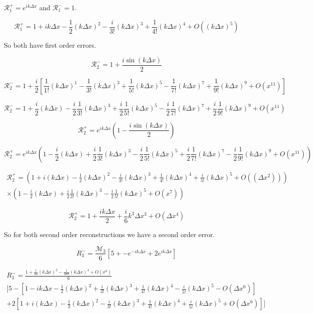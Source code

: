 \documentclass[12pt]{article}
\begin{document}
$\mathcal{R}^+_1 =  e^{ik\Delta x}$ and $\mathcal{R}^-_1 =  1$. 

\[\mathcal{R}^+_1 = 1 + i k\Delta x  - \frac{1}{2} (k\Delta x)^2 - \frac{i}{3!} (k\Delta x)^3 + \frac{1}{4!} (k\Delta x)^4 +  O((k\Delta x)^5)\]

So both have first order errors. 


\[\mathcal{R}_2^- = 1  + \frac{i\sin\left(k\Delta x\right)}{2}\]

\[\mathcal{R}_2^- = 1  + \frac{i}{2} \left[\frac{1}{1!} (k \Delta x)^1 - \frac{1}{3!} (k \Delta x)^3 + \frac{1}{5!} (k \Delta x)^5 - \frac{1}{7!} (k \Delta x)^7 + \frac{1}{9!} (k \Delta x)^{9} + O(x^{11})\right]\]

\[\mathcal{R}_2^- = 1  + \frac{i}{2} (k \Delta x) - \frac{i}{2}\frac{1}{3!} (k \Delta x)^3 + \frac{i}{2}\frac{1}{5!} (k \Delta x)^5 - \frac{i}{2}\frac{1}{7!} (k \Delta x)^7 + \frac{i}{2}\frac{1}{9!} (k \Delta x)^{9} + O(x^{11})\]




\[\mathcal{R}_2^+ = e^{ik\Delta x}\left(1  - \frac{i\sin\left(k\Delta x\right)}{2} \right)\]

\[\mathcal{R}_2^+ = e^{ik\Delta x}\left(1  - \frac{i}{2} (k \Delta x) + \frac{i}{2}\frac{1}{3!} (k \Delta x)^3 - \frac{i}{2}\frac{1}{5!} (k \Delta x)^5 + \frac{i}{2}\frac{1}{7!} (k \Delta x)^7 - \frac{i}{2}\frac{1}{9!} (k \Delta x)^{9} + O(x^{11}) \right)\]

\begin{multline}
\mathcal{R}_2^+ = \left(1 + i (k\Delta x)  - \frac{1}{2} (k\Delta x)^2 - \frac{i}{3!} (k\Delta x)^3 + \frac{1}{4!} (k\Delta x)^4 + \frac{i}{5!} (k\Delta x)^5 + O(\left(\Delta x^2\right))\right) \\ \times\left(1  - \frac{i}{2} (k \Delta x) + \frac{i}{2}\frac{1}{3!} (k \Delta x)^3 - \frac{i}{2}\frac{1}{5!} (k \Delta x)^5 + O(x^{7}) \right)
\end{multline}

\[\mathcal{R}_2^+ =1 + \frac{ik\Delta x}{2} + \frac{i}{6} k^3 \Delta x^3 + O\left(\Delta x ^4\right)\]

So for both second order reconstructions we have a second order error.

\[R_3^-= \frac{\mathcal{M}_3}{6}\left[5 +  - e^{-ik\Delta x} + 2e^{ik\Delta x} \right]\]

\begin{multline}
R_3^-= \frac{1 + \frac{1}{24} (k\Delta x)^2 - \frac{1}{288} (k\Delta x)^4 + O(x^{6})}{6} \\ \Bigg[5  - \left[1 - i k\Delta x  - \frac{1}{2} (k\Delta x)^2 + \frac{i}{3!} (k\Delta x)^3 + \frac{1}{4!} (k\Delta x)^4 - \frac{i}{5!} (k\Delta x)^5 - O( \Delta x^6)\right] \\ + 2 \left[1 + i (k\Delta x)  - \frac{1}{2} (k\Delta x) ^2 - \frac{i}{3!} (k\Delta x) ^3 + \frac{1}{4!} (k\Delta x) ^4 + \frac{i}{5!} (k\Delta x) ^5 + O(\Delta x ^6)\right] \Bigg] 
\end{multline}
\end{document}

